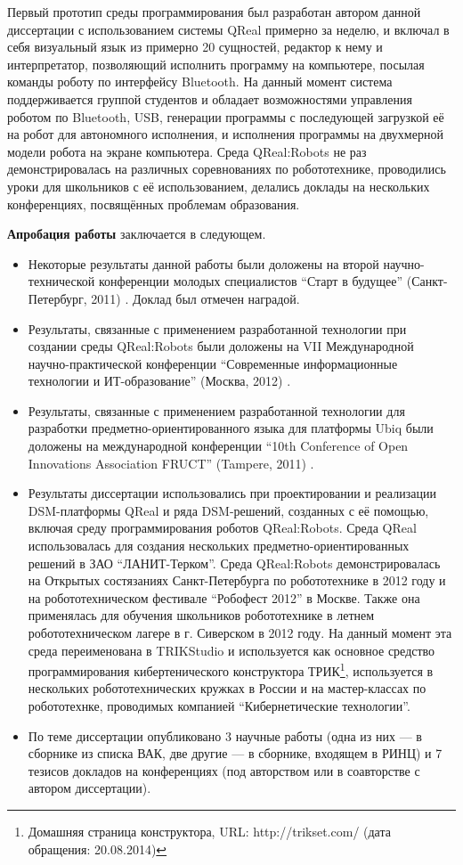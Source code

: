 Первый прототип среды программирования был разработан автором данной диссертации
с использованием системы QReal примерно за неделю, и включал в себя визуальный 
язык из примерно 20 сущностей, редактор к нему и интерпретатор, позволяющий 
исполнить программу на компьютере, посылая команды роботу по интерфейсу 
\ac{Bluetooth}. На данный момент система поддерживается группой студентов и обладает 
возможностями управления роботом по \ac{Bluetooth}, \ac{USB}, генерации программы с 
последующей загрузкой её на робот для автономного исполнения, и исполнения 
программы на двухмерной модели робота на экране компьютера. Среда QReal:Robots 
не раз демонстрировалась на различных соревнованиях по робототехнике, 
проводились уроки для школьников с её использованием, делались доклады на 
нескольких конференциях, посвящённых проблемам образования.

\textbf{Апробация работы} заключается в следующем.
\begin{itemize}
	\item Некоторые результаты данной работы были доложены на второй 
		научно-технической конференции молодых специалистов "`Старт в будущее"' 
		(Санкт-Петербург, 2011) \cite{kuzenkova2011metamodeling}. Доклад был 
		отмечен наградой.
	\item Результаты, связанные с применением разработанной технологии при 
		создании среды QReal:Robots были доложены на VII Международной 
		научно-практической конференции "`Современные информационные технологии 
		и ИТ-образование"' (Москва, 2012) \cite{litvinov2012robots}.
	\item Результаты, связанные с применением разработанной технологии для 
		разработки предметно-ориентированного языка для платформы Ubiq были доложены 
		на международной конференции "`10th Conference of Open Innovations 
		Association FRUCT"' (Tampere, 2011) \cite{bryksin2011ubiq}.
	\item Результаты диссертации использовались  при проектировании и реализации 
		DSM-платформы QReal и ряда DSM-решений, созданных с её помощью, включая 
		среду программирования роботов QReal:Robots. Среда QReal использовалась для 
		создания нескольких предметно-ориентированных решений в ЗАО “ЛАНИТ-Терком”. 
		Среда QReal:Robots демонстрировалась на Открытых состязаниях 
		Санкт-Петербурга по робототехнике в 2012 году и на робототехническом 
		фестивале "`Робофест 2012"' в Москве. Также она применялась для обучения 
		школьников робототехнике в летнем робототехническом лагере в 
		г. Сиверском в 2012 году. На данный момент эта среда переименована в 
		TRIKStudio и используется как основное средство программирования 
		кибертенического конструктора 
		ТРИК\footnote{Домашняя страница конструктора, URL: http://trikset.com/ (дата обращения: 20.08.2014)},
		используется в нескольких робототехнических кружках в России и на мастер-классах
		по робототехнке, проводимых компанией "`Кибернетические технологии"'.
	\item По теме диссертации опубликовано 3 научные работы (одна из них ---
		в сборнике из списка ВАК, две другие --- в сборнике, входящем в РИНЦ) и 
		7 тезисов докладов на конференциях (под авторством или в соавторстве с 
		автором диссертации).
\end{itemize}

